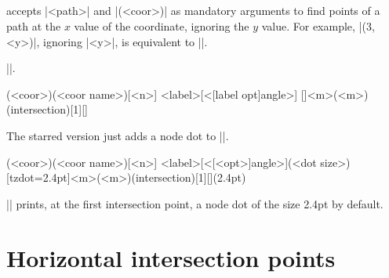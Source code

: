 \subsection{\protect\cmd{\tzvXpoint(*)}}
\label{ss:tzvXpoint}

\icmd{\tzvXpoint} accepts |{<path>}| and |(<coor>)| as mandatory arguments to find  points of a path at the $x$ value of the coordinate, ignoring the $y$ value.
For example, |(3,<y>)|, ignoring |<y>|, is equivalent to ||.

 |\tzvXpointat|.

\begin{tzdef}
(<coor>)(<coor name>)[<n>]
          {<label>}[<[label opt]angle>]
  []{<m>}(<m>)(intersection)[1]{}[]
\end{tzdef}

The starred version \icmd{\tzvXpoint*} just adds a node dot to |\tzvXpoint|.

\begin{tzdef}
(<coor>)(<coor name>)[<n>]
           {<label>}[<[<opt>]angle>](<dot size>)
  [tzdot=2.4pt]{<m>}(<m>)(intersection)[1]{}[](2.4pt)
\end{tzdef}

|\tzvXpoint*| prints, at the first intersection point, a node dot of the size 2.4pt by default.

\begin{tzcode}{.3}
\end{tzcode}



\section{Horizontal intersection points}
\label{s:tzhXpointat}

\subsection{\protect\cmd{\tzhXpointat(*)}}
\label{ss:tzhXpointat}

